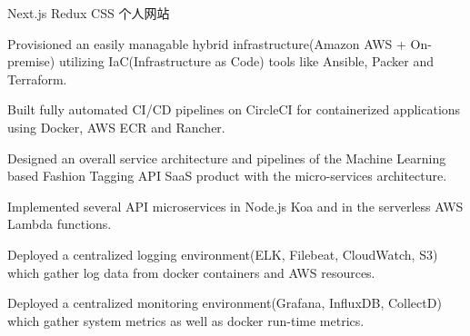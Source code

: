 

\begin{cventries}

  \cventry
    {Next.js Redux CSS} %
    {个人网站} %
    {} %
    {} %
    {
      \begin{cvitems} %
        \item {Provisioned an easily managable hybrid infrastructure(Amazon AWS + On-premise) utilizing IaC(Infrastructure as Code) tools like Ansible, Packer and Terraform.}
        \item {Built fully automated CI/CD pipelines on CircleCI for containerized applications using Docker, AWS ECR and Rancher.}
        \item {Designed an overall service architecture and pipelines of the Machine Learning based Fashion Tagging API SaaS product with the micro-services architecture.}
        \item {Implemented several API microservices in Node.js Koa and in the serverless AWS Lambda functions.}
        \item {Deployed a centralized logging environment(ELK, Filebeat, CloudWatch, S3) which gather log data from docker containers and AWS resources.}
        \item {Deployed a centralized monitoring environment(Grafana, InfluxDB, CollectD) which gather system metrics as well as docker run-time metrics.}
      \end{cvitems}
    }

\end{cventries}

